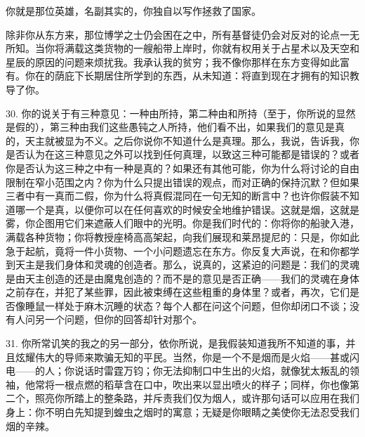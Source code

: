 你就是那位英雄，名副其实的，\newline{}你独自以写作拯救了国家。\par

除非你从东方来，那位博学之士仍会困在之中，所有基督徒仍会对反对的论点一无所知。当你将满载这类货物的一艘船带上岸时，你就有权用关于占星术以及天空和星辰的原因的问题来烦扰我。我承认我的贫穷；我不像你那样在东方变得如此富有。你在的荫庇下长期居住所学到的东西，从未知道：将直到现在才拥有的知识教导了你。\par

30. 你的说关于有三种意见：一种由所持，第二种由和所持（至于，你所说的显然是假的），第三种由我们这些愚钝之人所持，他们看不出，如果我们的意见是真的，天主就被显为不义。之后你说你不知道什么是真理。那么，我说，告诉我，你是否认为在这三种意见之外可以找到任何真理，以致这三种可能都是错误的？或者你是否认为这三种之中有一种是真的？如果还有其他可能，你为什么将讨论的自由限制在窄小范围之内？你为什么只提出错误的观点，而对正确的保持沉默？但如果三者中有一真而二假，你为什么将真假混同在一句无知的断言中？也许你假装不知道哪一个是真，以便你可以在任何喜欢的时候安全地维护错误。这就是烟，这就是雾，你企图用它们来遮蔽人们眼中的光明。你是我们时代的：你将你的船驶入港，满载各种货物；你将教授座椅高高架起，向我们展现和莱昂提尼的：只是，你如此急于起航，竟将一件小货物、一个小问题遗忘在东方。你反复大声说，在和你都学到天主是我们身体和灵魂的创造者。那么，说真的，这紧迫的问题是：我们的灵魂是由天主创造的还是由魔鬼创造的？而不是的意见是否正确——我们的灵魂在身体之前存在，并犯了某些罪，因此被束缚在这些粗重的身体里？或者，再次，它们是否像睡鼠一样处于麻木沉睡的状态？每个人都在问这个问题，但你却闭口不谈；没有人问另一个问题，但你的回答却针对那个。\par

31. 你所常讥笑的我之的另一部分，依你所说，是我假装知道我所不知道的事，并且炫耀伟大的导师来欺骗无知的平民。当然，你是一个不是烟而是火焰——甚或闪电——的人；你说话时雷霆万钧；你无法抑制口中生出的火焰，就像犹太叛乱的领袖，他常将一根点燃的稻草含在口中，吹出来以显出喷火的样子；同样，你也像第二个，照亮你所踏上的整条路，并斥责我们仅为烟人，或许那句话可以应用在我们身上：你不明白先知提到蝗虫之烟时的寓意；无疑是你眼睛之美使你无法忍受我们烟的辛辣。\par


